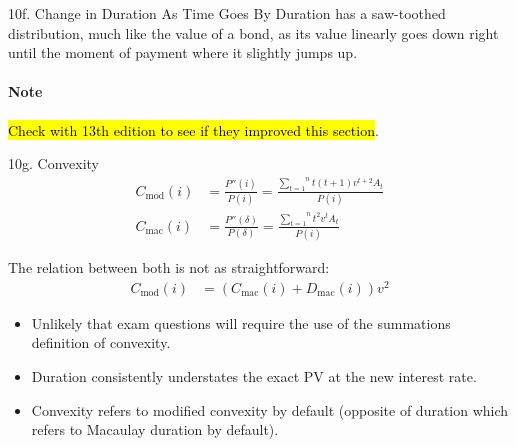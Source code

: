 \begin{CHPT_SUMM_AUTO}[label = {L.-10f}]{10f. Change in Duration As Time Goes By}
Duration has a saw-toothed distribution, much like the value of a bond, as its value linearly goes down right until the moment of payment where it slightly jumps up.

\paragraph{Note}	\hl{Check with 13th edition to see if they improved this section}.
\end{CHPT_SUMM_AUTO}

\begin{CHPT_SUMM_AUTO}[label = {L.-10g}]{10g. Convexity}
\begin{align*}
	C_{\text{mod}}(i)
	&=	\frac{P''(i)}{P(i)}
	=	\frac{\overset{n}{\underset{t = 1}{\sum}} t (t + 1) v^{t + 2} A_{t}}{P(i)}	\\
	C_{\text{mac}}(i)
	&=	\frac{P''(\delta)}{P(\delta)}
	=	\frac{\overset{n}{\underset{t = 1}{\sum}} t^{2} v^{t} A_{t}}{P(i)}
\end{align*}

The relation between both is not as straightforward:
\begin{align*}
	C_{\text{mod}}(i)
	&=	(C_{\text{mac}}(i) + D_{\text{mac}}(i))v^{2}
\end{align*}

\begin{itemize}[leftmargin = *]
	\item	Unlikely that exam questions will require the use of the summations definition of convexity.
	\item	Duration consistently understates the exact PV at the new interest rate.
	\item	Convexity refers to modified convexity by default (opposite of duration which refers to Macaulay duration by default).
\end{itemize}
\end{CHPT_SUMM_AUTO}


